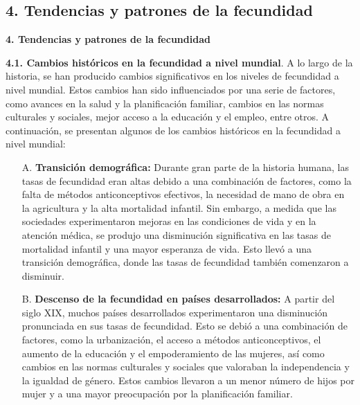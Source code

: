 \documentclass[8pt,a4paper]{beamer}
\begin{document}
{\subsection{4. Tendencias y patrones de la fecundidad}
\begin{frame}{\textbf{4. Tendencias y patrones de la fecundidad}}
\setlength{\parskip}{3px}
\justifying
\begin{block}{\textbf{4.1. Cambios históricos en la fecundidad a nivel mundial}.}
\setlength{\parskip}{3px}
\justifying
A lo largo de la historia, se han producido cambios significativos en los niveles de fecundidad a nivel mundial. Estos cambios han sido influenciados por una serie de factores, como avances en la salud y la planificación familiar, cambios en las normas culturales y sociales, mejor acceso a la educación y el empleo, entre otros. A continuación, se presentan algunos de los cambios históricos en la fecundidad a nivel mundial:
\begin{enumerate}
\setlength{\parskip}{3px}
\justifying
\item[A.] \textbf{Transición demográfica:} Durante gran parte de la historia humana, las tasas de fecundidad eran altas debido a una combinación de factores, como la falta de métodos anticonceptivos efectivos, la necesidad de mano de obra en la agricultura y la alta mortalidad infantil. Sin embargo, a medida que las sociedades experimentaron mejoras en las condiciones de vida y en la atención médica, se produjo una disminución significativa en las tasas de mortalidad infantil y una mayor esperanza de vida. Esto llevó a una transición demográfica, donde las tasas de fecundidad también comenzaron a disminuir.

\end{enumerate}
\end{block}
\end{frame}

\begin{frame}{}

\begin{block}{}
\setlength{\parskip}{3px}
\justifying
\begin{enumerate}
\setlength{\parskip}{3px}
\justifying
\item[B.] \textbf{Descenso de la fecundidad en países desarrollados:} A partir del siglo XIX, muchos países desarrollados experimentaron una disminución pronunciada en sus tasas de fecundidad. Esto se debió a una combinación de factores, como la urbanización, el acceso a métodos anticonceptivos, el aumento de la educación y el empoderamiento de las mujeres, así como cambios en las normas culturales y sociales que valoraban la independencia y la igualdad de género. Estos cambios llevaron a un menor número de hijos por mujer y a una mayor preocupación por la planificación familiar.


\end{enumerate}
\end{block}
\end{frame}}
\end{document}
